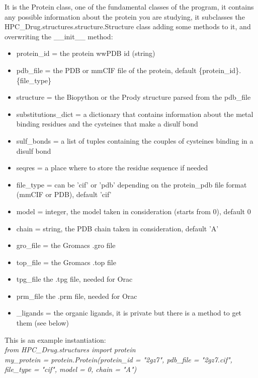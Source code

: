 		It is the Protein class, one of the fundamental classes of the program, it contains any possible information about the protein you are studying, it subclasses the HPC\_Drug.structures.structure.Structure class adding some methods to it, and overwriting the \_\_init\_\_ method:
		\begin{itemize}
			\item protein\_id = the protein wwPDB id (string)
			\item pdb\_file = the PDB or mmCIF file of the protein, default \{protein\_id\}.\{file\_type\}
			\item structure = the Biopython\cite{biopython} or the Prody\cite{prody} structure parsed from the pdb\_file
			\item substitutions\_dict = a dictionary that contains information about the metal binding residues and the cysteines that make a disulf bond
			\item sulf\_bonds = a list of tuples containing the couples of cysteines binding in a disulf bond
			\item seqres = a place where to store the residue sequence if needed
			\item file\_type = can be 'cif' or 'pdb' depending on the protein\_pdb file format (mmCIF or PDB), default 'cif'
			\item model = integer, the model taken in consideration (starts from 0), default 0
			\item chain = string, the PDB chain taken in consideration, default 'A'
			\item gro\_file = the Gromacs\cite{gromacs_ABRAHAM201519} .gro file
			\item top\_file = the Gromacs\cite{gromacs_ABRAHAM201519} .top file
			\item tpg\_file the .tpg file, needed for Orac\cite{orac}
			\item prm\_file the .prm file, needed for Orac\cite{orac}
			\item \_ligands = the organic ligands, it is private but there is a method to get them (see below)	
		\end{itemize}
	
		This is an example instantiation:\\
		\textit{from HPC\_Drug.structures import protein\\
		$\ $\\
		my\_protein = protein.Protein(protein\_id = "2gz7", pdb\_file = "2gz7.cif", file\_type = "cif", model = 0, chain = "A")}
	
